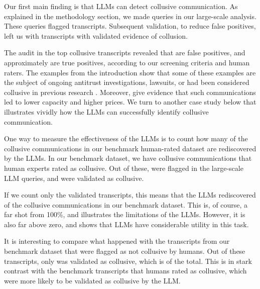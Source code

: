 Our first main finding is that LLMs can detect collusive communication. As explained in the methodology section, we made  queries in our large-scale analysis. These queries flagged  transcripts. Subsequent validation, to reduce false positives, left us with  transcripts with validated evidence of collusion.

The audit in the top collusive transcripts revealed that  are false positives, and approximately  are true positives, according to our screening criteria and human raters. The examples from the introduction show that some of these examples are the subject of ongoing antitrust investigations, lawsuits, or had been considered collusive in previous research \parencite{aryal2022coordinated, harrington2022collusion}. Moreover, \textcite{aryal2022coordinated} give evidence that such communications led to lower capacity and higher prices. We turn to another case study below that illustrates vividly how the LLMs can successfully identify collusive communication.

One way to measure the effectiveness of the LLMs is to count how many of the collusive communications in our benchmark human-rated dataset are rediscovered by the LLMs. In our benchmark dataset, we have  collusive communications that human experts rated as collusive. Out of these,  were flagged in the large-scale LLM queries, and  were validated as collusive.

If we count only the validated transcripts, this means that the LLMs rediscovered  of the collusive communications in our benchmark dataset. This is, of course, a far shot from 100\%, and illustrates the limitations of the LLMs. However, it is also far above zero, and shows that LLMs have considerable utility in this task.

It is interesting to compare what happened with the transcripts from our benchmark dataset that were flagged as not collusive by humans. Out of these transcripts, only  was validated as collusive, which is  of the total. This is in stark contrast with the benchmark transcripts that humans rated as collusive, which were  more likely to be validated as collusive by the LLM.